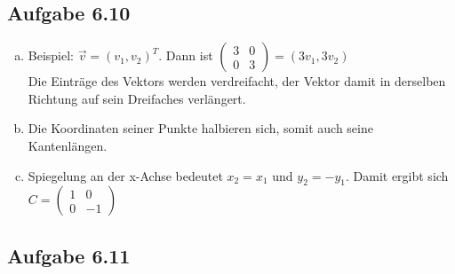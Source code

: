 \documentclass{standalone}
\begin{document}
\subsection{Aufgabe 6.10}
\begin{enumerate}[a)]
    \item Beispiel: $\vec{v} = (v_1, v_2)^T$. Dann ist $\begin{pmatrix}
        3 & 0 \\
        0 & 3
    \end{pmatrix}
    = (3v_1, 3v_2)$\\
    Die Einträge des Vektors werden verdreifacht, der Vektor damit in derselben Richtung auf sein Dreifaches verlängert.
    \item Die Koordinaten seiner Punkte halbieren sich, somit auch seine Kantenlängen.
    \item Spiegelung an der x-Achse bedeutet $x_2 = x_1$ und $y_2 = -y_1$. Damit ergibt sich $C = \begin{pmatrix}
        1 & 0 \\
        0 & -1
    \end{pmatrix}$
\end{enumerate}

\subsection{Aufgabe 6.11}
\end{document}
